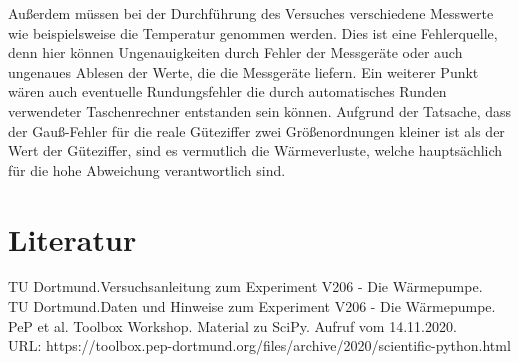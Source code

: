 \documentclass[titlepage=firstcover, captions=tableheading]{scrartcl}
\begin{document}
Außerdem müssen bei der Durchführung des Versuches verschiedene Messwerte wie beispielsweise die Temperatur genommen werden.
Dies ist eine Fehlerquelle, denn hier können Ungenauigkeiten durch Fehler der Messgeräte oder auch ungenaues Ablesen der Werte, die die Messgeräte liefern.
Ein weiterer Punkt wären auch eventuelle Rundungsfehler die durch automatisches Runden verwendeter Taschenrechner entstanden sein können.
Aufgrund der Tatsache, dass der Gauß-Fehler für die reale Güteziffer zwei Größenordnungen kleiner ist als der Wert der Güteziffer,
sind es vermutlich die Wärmeverluste, welche hauptsächlich für die hohe Abweichung verantwortlich sind. 

\section{Literatur}
TU Dortmund.Versuchsanleitung zum Experiment V206 - Die Wärmepumpe.\\
TU Dortmund.Daten und Hinweise zum Experiment V206 - Die Wärmepumpe.\\
PeP et al. Toolbox Workshop. Material zu SciPy. Aufruf vom 14.11.2020.\\
URL: https://toolbox.pep-dortmund.org/files/archive/2020/scientific-python.html
\end{document}
